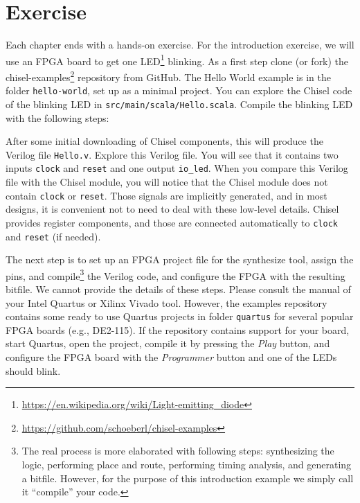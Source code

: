 \documentclass[%
    10pt,
    headinclude, footexclude,
    openright, %
    notitlepage,
    cleardoubleempty,
    headsepline,
    pointlessnumbers,
    bibtotoc, idxtotoc,
    ]{scrbook}
\newcommand{\code}[1]{{\small{\texttt{#1}}}}
\newcommand{\myref}[2]{\href{#1}{#2}}
\renewcommand{\myref}[2]{{#2}{\footnote{\url{#1}}}}
\begin{document}
\section{Exercise}

Each chapter ends with a hands-on exercise. For the introduction exercise, we will use an
FPGA board to get one \myref{https://en.wikipedia.org/wiki/Light-emitting_diode}{LED} blinking.
As a first step clone (or fork) the \myref{https://github.com/schoeberl/chisel-examples}{chisel-examples}
repository from GitHub.
The Hello World example is in the folder \code{hello-world}, set up as
a minimal project. You can explore the Chisel code of the blinking LED
in \code{src/main/scala/Hello.scala}.
Compile the blinking LED with the following steps:


After some initial downloading of Chisel components, this will produce the Verilog file \code{Hello.v}.
Explore this Verilog file. You will see that it contains two inputs \code{clock} and \code{reset}
and one output \code{io\_led}. When you compare this Verilog file with the Chisel module,
you will notice that the Chisel module does not contain \code{clock} or \code{reset}.
Those signals are implicitly generated, and in most designs, it is convenient not to need to
deal with these low-level details. Chisel provides register components, and those
are connected automatically to \code{clock} and \code{reset} (if needed).

The next step is to set up an FPGA project file for the synthesize tool, assign the pins,
and compile\footnote{The real process is more elaborated with following steps: synthesizing the logic,
performing place and route, performing timing analysis, and generating a bitfile.
However, for the purpose of this introduction example we simply call it ``compile''
your code.} the Verilog code, and configure the FPGA with the resulting bitfile.
We cannot provide the details of these steps. Please consult the manual of
your Intel Quartus or Xilinx Vivado tool.
However, the examples repository contains some ready to use Quartus
projects in folder \code{quartus} for several popular FPGA boards (e.g., DE2-115).
If the repository contains support for your board, start Quartus, open the project,
compile it by pressing the \emph{Play} button, and configure the FPGA board
with the \emph{Programmer} button and one of the LEDs should blink.
\end{document}
